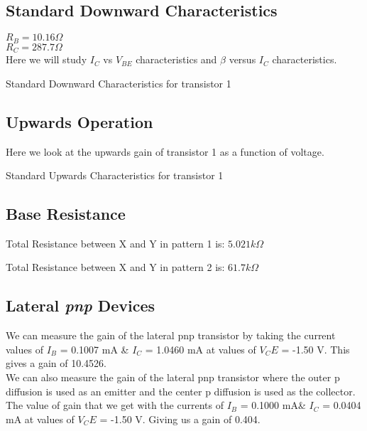 \subsection{Standard Downward Characteristics}
$R_B = 10.16 \Omega$\\
$R_C = 287.7 \Omega$\\
Here we will study $I_C$ vs $V_{BE}$ characteristics and $\beta$ versus $I_C$ characteristics.

\begin{table}[ht]
    
    \caption{Standard Downward Characteristics for transistor 1}
    \label{tab:down}
\end{table}


\subsection{Upwards Operation}

Here we look at the upwards gain of transistor 1 as a function of voltage.

\begin{table}[ht]
    
    \caption{Standard Upwards Characteristics for transistor 1}
    \label{tab:up}
\end{table}


\subsection{Base Resistance}

Total Resistance between X and Y in pattern 1 is: $5.021 k \Omega$

Total Resistance between X and Y in pattern 2 is: $61.7 k \Omega$


\subsection{Lateral \textit{pnp} Devices}


We can measure the gain of the lateral pnp transistor by taking the current values of $I_B$ = 0.1007 mA \& $I_C$ = 1.0460 mA at values of $V_CE$ = -1.50 V. This gives a gain of 10.4526. \\


We can also measure the gain of the lateral pnp transistor where the outer p diffusion is used as an emitter and the center p diffusion is used as the collector. The value of gain that we get with the currents of $I_B$ = 0.1000 mA\& $I_C$ = 0.0404 mA at values of $V_CE$ = -1.50 V. Giving us a gain of 0.404.

